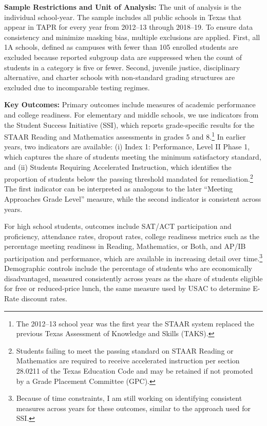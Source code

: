\textbf{Sample Restrictions and Unit of Analysis:} The unit of analysis is the individual school-year. The sample includes all public schools in Texas that appear in TAPR for every year from 2012--13 through 2018--19. To ensure data consistency and minimize masking bias, multiple exclusions are applied. First, all 1A schools, defined as campuses with fewer than 105 enrolled students are excluded because reported subgroup data are suppressed when the count of students in a category is five or fewer. Second, juvenile justice, disciplinary alternative, and charter schools with non-standard grading structures are excluded due to incomparable testing regimes.

\textbf{Key Outcomes:} Primary outcomes include measures of academic performance and college readiness. For elementary and middle schools, we use indicators from the Student Success Initiative (SSI), which reports grade-specific results for the STAAR Reading and Mathematics assessments in grades 5 and 8.\footnote{The 2012--13 school year was the first year the STAAR system replaced the previous Texas Assessment of Knowledge and Skills (TAKS).} In earlier years, two indicators are available: (i) Index 1: Performance, Level II Phase 1, which captures the share of students meeting the minimum satisfactory standard, and (ii) Students Requiring Accelerated Instruction, which identifies the proportion of students below the passing threshold mandated for remediation.\footnote{Students failing to meet the passing standard on STAAR Reading or Mathematics are required to receive accelerated instruction per section 28.0211 of the Texas Education Code and may be retained if not promoted by a Grade Placement Committee (GPC).} The first indicator can be interpreted as analogous to the later “Meeting Approaches Grade Level” measure, while the second indicator is consistent across years.

For high school students, outcomes include SAT/ACT participation and proficiency, attendance rates, dropout rates, college readiness metrics such as the percentage meeting readiness in Reading, Mathematics, or Both, and AP/IB participation and performance, which are available in increasing detail over time.\footnote{Because of time constraints, I am still working on identifying consistent measures across years for these outcomes, similar to the approach used for SSI.} Demographic controls include the percentage of students who are economically disadvantaged, measured consistently across years as the share of students eligible for free or reduced-price lunch, the same measure used by USAC to determine E-Rate discount rates.

